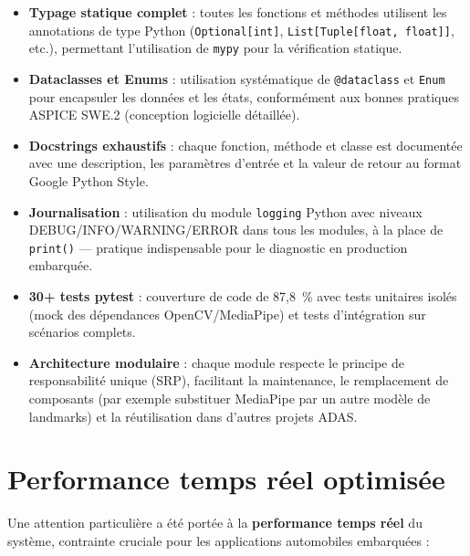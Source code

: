 \documentclass[12pt,a4paper]{report}
\begin{document}
\begin{itemize}
  \item \textbf{Typage statique complet} : toutes les fonctions et m\'ethodes utilisent les annotations de type Python (\texttt{Optional[int]}, \texttt{List[Tuple[float, float]]}, etc.), permettant l'utilisation de \texttt{mypy} pour la v\'erification statique.
  \item \textbf{Dataclasses et Enums} : utilisation syst\'ematique de \texttt{@dataclass} et \texttt{Enum} pour encapsuler les donn\'ees et les \'etats, conformément aux bonnes pratiques ASPICE SWE.2 (conception logicielle d\'etaill\'ee).
  \item \textbf{Docstrings exhaustifs} : chaque fonction, m\'ethode et classe est document\'ee avec une description, les param\`etres d'entr\'ee et la valeur de retour au format Google Python Style.
  \item \textbf{Journalisation} : utilisation du module \texttt{logging} Python avec niveaux DEBUG/INFO/WARNING/ERROR dans tous les modules, \`a la place de \texttt{print()} — pratique indispensable pour le diagnostic en production embarqu\'ee.
  \item \textbf{30+ tests pytest} : couverture de code de 87,8~\% avec tests unitaires isol\'es (mock des d\'ependances OpenCV/MediaPipe) et tests d'int\'egration sur sc\'enarios complets.
  \item \textbf{Architecture modulaire} : chaque module respecte le principe de responsabilit\'e unique (SRP), facilitant la maintenance, le remplacement de composants (par exemple substituer MediaPipe par un autre mod\`ele de landmarks) et la r\'eutilisation dans d'autres projets ADAS.
\end{itemize}

\section{Performance temps r\'eel optimis\'ee}

Une attention particuli\`ere a \'et\'e port\'ee \`a la \textbf{performance temps r\'eel} du syst\`eme, contrainte cruciale pour les applications automobiles embarqu\'ees :
\end{document}
